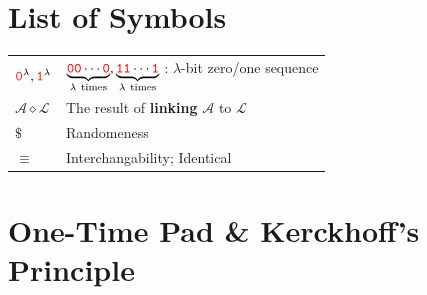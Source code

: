 \documentclass[12pt,openany]{book}
\theoremstyle{definition}
\newcommand{\library}{\mathcal{L}}
\newcommand{\zero}{\textcolor{red}{\texttt{0}}}
\newcommand{\one}{\textcolor{red}{\texttt{1}}}
\newcommand{\adversary}{\mathcal{A}}
\newcommand{\linking}{\diamond}
\newcommand{\randomness}{\$}
\begin{document}
	\tableofcontents
	
	\mainmatter
	
	\chapter*{List of Symbols}
	
	\begin{tabular}{ll}
		\( \zero^\lambda, \one^\lambda\) & \(\underbrace{\zero\zero\cdots\zero}_{\lambda\ \text{times}}, \underbrace{\one\one\cdots\one}_{\lambda\ \text{times}}\) : \(\lambda\)-bit zero/one sequence \\
		\( \adversary\linking\library \) & The result of \textbf{linking} $\adversary$ to  $\library$ \\
		\( \randomness \) & Randomeness \\
		\( \equiv \) & Interchangability; Identical
	\end{tabular}
	
	\chapter{One-Time Pad \& Kerckhoff's Principle}
	
\end{document}
